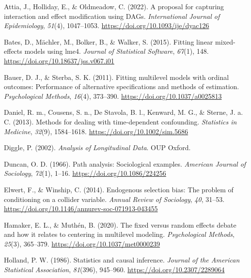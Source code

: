 \documentclass[
  11pt,
  a4paper,
]{article}
\newlength{\cslhangindent}
\newenvironment{CSLReferences}[2] %
 {\begin{list}{}{%
  \setlength{\itemindent}{0pt}
  \setlength{\leftmargin}{0pt}
  \setlength{\parsep}{0pt}
  \ifodd #1
   \setlength{\leftmargin}{\cslhangindent}
   \setlength{\itemindent}{-1\cslhangindent}
  \fi
  \setlength{\itemsep}{#2\baselineskip}}}
 {\end{list}}
\begin{document}
\label{refs}
\begin{CSLReferences}{1}{0}
Attia, J., Holliday, E., \& Oldmeadow, C. (2022). A proposal for
capturing interaction and effect modification using DAGs.
\emph{International Journal of Epidemiology}, \emph{51}(4), 1047--1053.
\url{https://doi.org/10.1093/ije/dyac126}

Bates, D., Mächler, M., Bolker, B., \& Walker, S. (2015). Fitting linear
mixed-effects models using {lme4}. \emph{Journal of Statistical
Software}, \emph{67}(1), 148.
\url{https://doi.org/10.18637/jss.v067.i01}

Bauer, D. J., \& Sterba, S. K. (2011). Fitting multilevel models with
ordinal outcomes: Performance of alternative specifications and methods
of estimation. \emph{Psychological Methods}, \emph{16}(4), 373--390.
\url{https://doi.org/10.1037/a0025813}

Daniel, R. m., Cousens, S. n., De Stavola, B. l., Kenward, M. G., \&
Sterne, J. a. C. (2013). Methods for dealing with time-dependent
confounding. \emph{Statistics in Medicine}, \emph{32}(9), 1584--1618.
\url{https://doi.org/10.1002/sim.5686}

Diggle, P. (2002). \emph{Analysis of Longitudinal Data}. OUP Oxford.

Duncan, O. D. (1966). Path analysis: Sociological examples.
\emph{American Journal of Sociology}, \emph{72}(1), 1--16.
\url{https://doi.org/10.1086/224256}

Elwert, F., \& Winship, C. (2014). Endogenous selection bias: The
problem of conditioning on a collider variable. \emph{Annual Review of
Sociology}, \emph{40}, 31--53.
\url{https://doi.org/10.1146/annurev-soc-071913-043455}

Hamaker, E. L., \& Muthén, B. (2020). The fixed versus random effects
debate and how it relates to centering in multilevel modeling.
\emph{Psychological Methods}, \emph{25}(3), 365--379.
\url{https://doi.org/10.1037/met0000239}

Holland, P. W. (1986). Statistics and causal inference. \emph{Journal of
the American Statistical Association}, \emph{81}(396), 945--960.
\url{https://doi.org/10.2307/2289064}


\end{CSLReferences}
\end{document}
